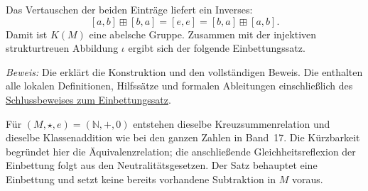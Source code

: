 Das Vertauschen der beiden Einträge liefert ein Inverses:
\[
  [a,b]\boxplus[b,a]=[e,e]=[b,a]\boxplus[a,b].
\]
Damit ist \(K(M)\) eine abelsche Gruppe. Zusammen mit der
injektiven strukturtreuen Abbildung \(\iota\) ergibt sich der
folgende Einbettungssatz.

\setcounter{formulaThm}{3}
\hypertarget{differences.main}{}


\noindent\emph{Beweis:} Die \DifferencesReadingLink{} erklärt die
Konstruktion und den vollständigen Beweis. Die
\DifferencesProofsLink{} enthalten alle lokalen Definitionen,
Hilfssätze und formalen Ableitungen einschließlich des
\href{\DifferencesEditionDirectory_B41-differences-proofs.pdf\#differences.proof}%
  {Schlussbeweises zum Einbettungssatz}.

Für \((M,\star,e)=(\mathbb N,+,0)\) entstehen dieselbe
Kreuzsummenrelation und dieselbe Klassenaddition wie bei den ganzen
Zahlen in Band~17. Die Kürzbarkeit begründet hier die Äquivalenzrelation;
die anschließende Gleichheitsreflexion der Einbettung folgt aus den
Neutralitätsgesetzen. Der Satz behauptet eine Einbettung und setzt
keine bereits vorhandene Subtraktion in \(M\) voraus.
